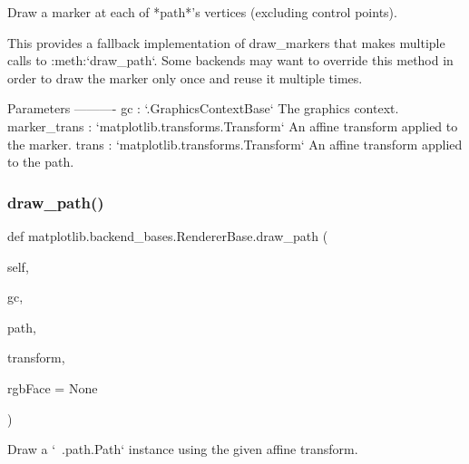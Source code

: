 \begin{DoxyVerb}Draw a marker at each of *path*'s vertices (excluding control points).

This provides a fallback implementation of draw_markers that
makes multiple calls to :meth:`draw_path`.  Some backends may
want to override this method in order to draw the marker only
once and reuse it multiple times.

Parameters
----------
gc : `.GraphicsContextBase`
    The graphics context.
marker_trans : `matplotlib.transforms.Transform`
    An affine transform applied to the marker.
trans : `matplotlib.transforms.Transform`
    An affine transform applied to the path.
\end{DoxyVerb}
 \mbox{\label{classmatplotlib_1_1backend__bases_1_1RendererBase_a7a569a35392227927ec8e773ac679044}} 
\subsubsection{\texorpdfstring{draw\+\_\+path()}{draw\_path()}}
{\footnotesize\ttfamily def matplotlib.\+backend\+\_\+bases.\+Renderer\+Base.\+draw\+\_\+path (\begin{DoxyParamCaption}\item[{}]{self,  }\item[{}]{gc,  }\item[{}]{path,  }\item[{}]{transform,  }\item[{}]{rgb\+Face = {\ttfamily None} }\end{DoxyParamCaption})}

\begin{DoxyVerb}Draw a `~.path.Path` instance using the given affine transform.\end{DoxyVerb}
 \mbox{\label{classmatplotlib_1_1backend__bases_1_1RendererBase_a67af48871bd25863d3f4c6aa523f9fe7}} 

